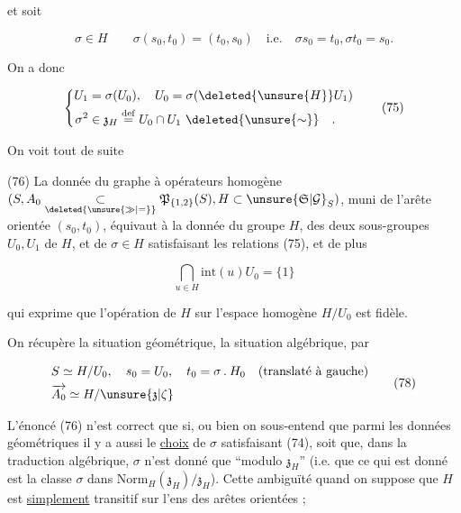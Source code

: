 et soit

\[
\sigma\in H\qquad\sigma(s_0,t_0)=(t_0,s_0)\quad\text{i.e.}\quad\sigma s_0=t_0,\sigma t_0=s_0.
\tag*{(74)}
\]

On a donc

\[
\left\{\begin{aligned}
U_1&=\sigma(U_0),\quad U_0=\sigma(\deleted{\unsure{H}}U_1)\\
\sigma^2&\in\mathfrak z_H\overset{\mathrm{def}}{=}U_0\cap U_1\ \deleted{\unsure{\sim}}\quad.
\end{aligned}\right.
\tag*{(75)}
\]


On voit tout de suite

(76) La donnée du graphe à opérateurs homogène $(S,A_0\underset{\deleted{\unsure{\gg|=}}}{\subset}\mathfrak P_{\{1,2\}}(S), H\subset\unsure{\mathfrak S|\mathcal G}_S)$, muni de l'arête orientée $(s_0,t_0)$, équivaut à la donnée du groupe $H$, des deux sous-groupes $U_0,U_1$ de $H$, et de $\sigma\in H$ satisfaisant les relations (75), et de plus

\[
\bigcap_{u\in H}\mathrm{int}(u)U_0=\{1\}
\tag*{(77)}
\]

qui exprime que l'opération de $H$ sur l'espace homogène $H/U_0$ est fidèle.

On récupère la situation géométrique,  la situation algébrique, par

\[
\begin{aligned}
&S\simeq H/U_0,\quad s_0=U_0,\quad t_0=\sigma\mathbin{.}H_0\quad\text{(translaté à gauche)}\\
&\overrightarrow{A_0}\simeq H/\unsure{\mathfrak z|\zeta}
\end{aligned}
\tag*{(78)}
\]

 L'énoncé (76) n'est correct que si, ou bien on sous-entend que parmi les données géométriques il y a aussi le \uline{choix} de $\sigma$ satisfaisant (74), soit que, dans la traduction algébrique, $\sigma$   n'est donné que \textquotedblleft{}modulo $\mathfrak z_H$\textquotedblright{} (i.e. que ce qui est donné est la classe   $\sigma$ dans $\mathrm{Norm}_H(\mathfrak z_H)/\mathfrak z_H$). Cette ambiguïté  quand on suppose que $H$ est \uline{simplement} transitif sur l'ens  des arêtes orientées ; 


